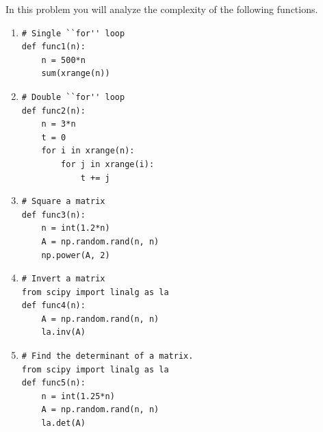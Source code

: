 \begin{problem}\label{prob:complexity_problem}
In this problem you will analyze the complexity of the following functions.

\begin{enumerate}
\renewcommand{\theenumi}{\alph{enumi}}
\item
\begin{lstlisting}
# Single ``for'' loop
def func1(n):
    n = 500*n
    sum(xrange(n))
\end{lstlisting}

\item 
\begin{lstlisting}
# Double ``for'' loop
def func2(n):
    n = 3*n
    t = 0
    for i in xrange(n):
        for j in xrange(i):
            t += j
\end{lstlisting}

\item
\begin{lstlisting}
# Square a matrix
def func3(n):
    n = int(1.2*n)
    A = np.random.rand(n, n)
    np.power(A, 2)
\end{lstlisting}

\item
\begin{lstlisting}
# Invert a matrix
from scipy import linalg as la
def func4(n):
    A = np.random.rand(n, n)
    la.inv(A)
\end{lstlisting}

\item 
\begin{lstlisting}
# Find the determinant of a matrix.
from scipy import linalg as la
def func5(n):
    n = int(1.25*n)
    A = np.random.rand(n, n)
    la.det(A)
\end{lstlisting}
\end{enumerate}



\end{problem}

